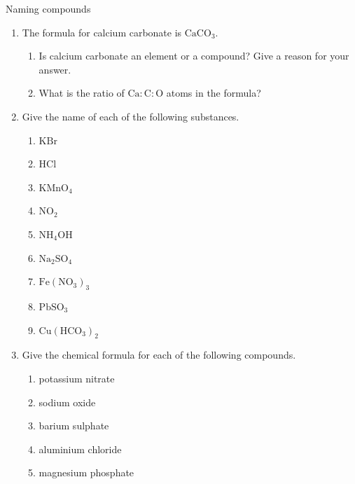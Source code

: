   \label{m38708*secfhsst!!!underscore!!!id255}
            \begin{exercises}{Naming compounds}
{            \nopagebreak \noindent
      \label{m38708*id65118}\begin{enumerate}[noitemsep, label=\textbf{\arabic*}. ] 
            \label{m38708*uid47}\item The formula for calcium carbonate is $\text{CaCO}{}_{3}$.
\label{m38708*id65148}\begin{enumerate}[noitemsep, label=\textbf{\alph*}. ] 
            \label{m38708*uid48}\item Is calcium carbonate an element or a compound? Give a reason for your answer.
\label{m38708*uid49}\item What is the ratio of $\text{Ca}:\text{C}:\text{O}$ atoms in the formula?
\end{enumerate}
\label{m38708*uid50}\item Give the name of each of the following substances.
\label{m38708*id65189}\begin{enumerate}[noitemsep, label=\textbf{\alph*}. ] 
            \label{m38708*uid51}\item $\text{KBr}$
\label{m38708*uid52}\item $\text{HCl}$
\label{m38708*uid53}\item ${\text{KMnO}}_{4}$\label{m38708*uid54}\item ${\text{NO}}_{2}$\label{m38708*uid55}\item ${\text{NH}}_{4}\text{OH}$
\label{m38708*uid56}\item ${\text{Na}}_{2}{\text{SO}}_{4}$
\item ${\text{Fe}}({\text{NO}}_{3})_3$
\item ${\text{Pb}}{\text{SO}}_{3}$
\item ${\text{Cu}}({\text{HCO}}_{3})_2$
\end{enumerate}
\label{m38708*uid57}\item Give the chemical formula for each of the following compounds.
\label{m38708*id65338}\begin{enumerate}[noitemsep, label=\textbf{\alph*}. ] 
            \label{m38708*uid58}\item potassium nitrate
\label{m38708*uid59}\item sodium oxide
\label{m38708*uid60}\item barium sulphate
\label{m38708*uid61}\item aluminium chloride
\label{m38708*uid62}\item magnesium phosphate

\end{enumerate}
\end{enumerate}}
\end{exercises}
